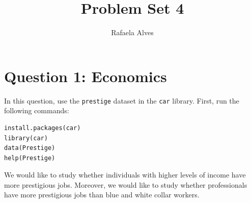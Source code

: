\documentclass[12pt,letterpaper]{article}
\title{Problem Set 4}
\author{Rafaela Alves}
\begin{document}
	\maketitle
	
\vspace{.2cm}

\section*{Question 1: Economics}
\vspace{.25cm}
\noindent 	
In this question, use the \texttt{prestige} dataset in the \texttt{car} library. First, run the following commands:

\begin{verbatim}
install.packages(car)
library(car)
data(Prestige)
help(Prestige)
\end{verbatim} 


\noindent We would like to study whether individuals with higher levels of income have more prestigious jobs. Moreover, we would like to study whether professionals have more prestigious jobs than blue and white collar workers.
\end{document}
